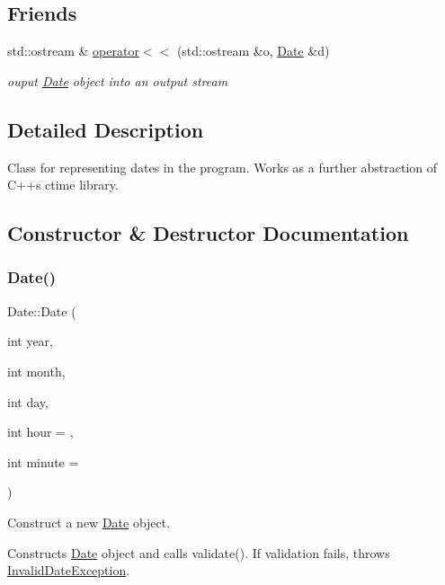 \subsection*{Friends}
\begin{DoxyCompactItemize}
\item 
std\+::ostream \& \mbox{\hyperlink{classDate_a2f114c7aa1398dac0f21b888bcb40f3e}{operator$<$$<$}} (std\+::ostream \&o, \mbox{\hyperlink{classDate}{Date}} \&d)
\begin{DoxyCompactList}\small\item\em ouput \mbox{\hyperlink{classDate}{Date}} object into an output stream \end{DoxyCompactList}\end{DoxyCompactItemize}


\subsection{Detailed Description}
Class for representing dates in the program. Works as a further abstraction of C++\textquotesingle{}s ctime library. 

\subsection{Constructor \& Destructor Documentation}
\mbox{\label{classDate_aa29ee0f04162437b91b758be0a4b75fc}} 
\subsubsection{\texorpdfstring{Date()}{Date()}\hspace{0.1cm}{\footnotesize\ttfamily [1/2]}}
{\footnotesize\ttfamily Date\+::\+Date (\begin{DoxyParamCaption}\item[{int}]{year,  }\item[{int}]{month,  }\item[{int}]{day,  }\item[{int}]{hour = {},  }\item[{int}]{minute = {} }\end{DoxyParamCaption})}



Construct a new \mbox{\hyperlink{classDate}{Date}} object. 

Constructs \mbox{\hyperlink{classDate}{Date}} object and calls validate(). If validation fails, throws \mbox{\hyperlink{classInvalidDateException}{Invalid\+Date\+Exception}}.


